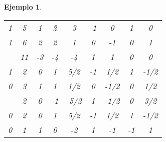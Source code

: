 \documentclass[11pt]{report}
\theoremstyle{mytheorem}
\theoremstyle{mydefinition}
\theoremstyle{myexample}
\newtheorem*{example}{Ejemplo}
\begin{document}
\begin{example}
\begin{center}
\begin{tabular}{|c|c|c|c|c|c|c|c|c|}
    1 & 5 & \multicolumn{1}{c}{\phantom{-}1} & \multicolumn{1}{c}{\phantom{-}2} & \multicolumn{1}{c}{\phantom{-}3} & \multicolumn{1}{c}{-1} & \multicolumn{1}{c}{\phantom{-}0} & \multicolumn{1}{c}{\phantom{-}1} & \multicolumn{1}{c|}{\phantom{-}0} \\
    
    1 & 6 & \multicolumn{1}{c}{\phantom{-}2} & \multicolumn{1}{c}{\phantom{-}2} & \multicolumn{1}{c}{\phantom{-}1} & \multicolumn{1}{c}{\phantom{-}0} & \multicolumn{1}{c}{-1} & \multicolumn{1}{c}{\phantom{-}0} & \multicolumn{1}{c|}{\phantom{-}1}\\ \hline
    
    \multicolumn{1}{c|}{} & 11 & \multicolumn{1}{c}{-3} & \multicolumn{1}{c}{-4} & \multicolumn{1}{c}{-4} & \multicolumn{1}{c}{\phantom{-}1} & \multicolumn{1}{c}{\phantom{-}1} & \multicolumn{1}{c}{\phantom{-}0} & \multicolumn{1}{c|}{\phantom{-}0} \\ \hhline{-|=|=|=|=|=|=|=|=|}
    
    1 & 2 & \multicolumn{1}{c}{\phantom{-}0} & \multicolumn{1}{c}{\phantom{-}1} & \multicolumn{1}{c}{\phantom{-}5/2} & \multicolumn{1}{c}{-1}& \multicolumn{1}{c}{\phantom{-}1/2} & \multicolumn{1}{c}{\phantom{-}1} & \multicolumn{1}{c|}{-1/2}  \\
    
    0 & 3 & \multicolumn{1}{c}{\phantom{-}1} & \multicolumn{1}{c}{\phantom{-}1} & \multicolumn{1}{c}{\phantom{-}1/2} & \multicolumn{1}{c}{\phantom{-}0}& \multicolumn{1}{c}{-1/2} & \multicolumn{1}{c}{\phantom{-}0} & \multicolumn{1}{c|}{\phantom{-}1/2} \\ \cline{1-9}
    
    \multicolumn{1}{c|}{} & 2 & \multicolumn{1}{c}{\phantom{-}0} & \multicolumn{1}{c}{-1} & \multicolumn{1}{c}{-5/2} & \multicolumn{1}{c}{\phantom{-}1} & \multicolumn{1}{c}{-1/2} & \multicolumn{1}{c}{\phantom{-}0} & \multicolumn{1}{c|}{\phantom{-}3/2} \\ \hhline{-|=|=|=|=|=|=|=|=|}

    0 & 2 & \multicolumn{1}{c}{\phantom{-}0} & \multicolumn{1}{c}{\phantom{-}1} & \multicolumn{1}{c}{\phantom{-}5/2} & \multicolumn{1}{c}{-1}& \multicolumn{1}{c}{\phantom{-}1/2} & \multicolumn{1}{c}{\phantom{-}1} & \multicolumn{1}{c|}{-1/2}  \\
    
    0 & 1 & \multicolumn{1}{c}{\phantom{-}1} & \multicolumn{1}{c}{\phantom{-}0} & \multicolumn{1}{c}{-2} & \multicolumn{1}{c}{\phantom{-}1}& \multicolumn{1}{c}{-1} & \multicolumn{1}{c}{-1} & \multicolumn{1}{c|}{\phantom{-}1} \\ \cline{1-9}
    

\end{tabular}
\end{center}
\end{example}
\end{document}
